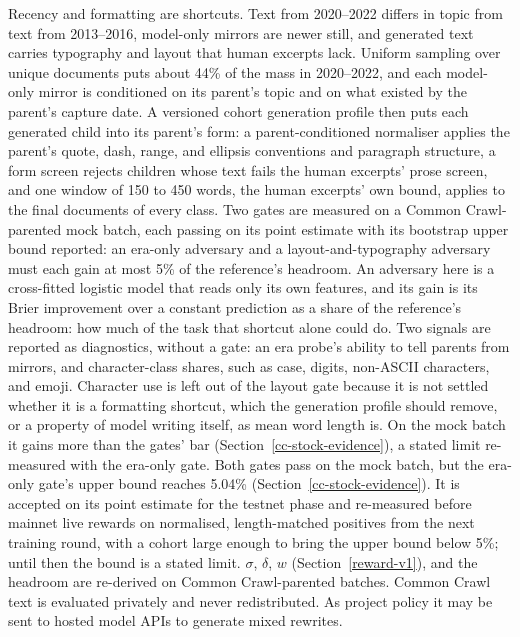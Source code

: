 Recency and formatting are shortcuts. Text from 2020--2022 differs in topic from
text from 2013--2016, model-only mirrors are newer still, and generated text
carries typography and layout that human excerpts lack. Uniform sampling over
unique documents puts about 44\% of the mass in 2020--2022, and each model-only
mirror is conditioned on its parent's topic and on what existed by the parent's
capture date. A versioned cohort generation profile then puts each generated
child into its parent's form: a parent-conditioned normaliser applies the
parent's quote, dash, range, and ellipsis conventions and paragraph structure, a
form screen rejects children whose text fails the human excerpts' prose screen,
and one window of 150 to 450 words, the human excerpts' own bound, applies to
the final documents of every class. Two gates are measured on a Common
Crawl-parented mock batch, each passing on its point estimate with its bootstrap
upper bound reported: an era-only adversary and a layout-and-typography
adversary must each gain at most 5\% of the reference's headroom. An adversary
here is a cross-fitted logistic model that reads only its own features, and its
gain is its Brier improvement over a constant prediction as a share of the
reference's headroom: how much of the task that shortcut alone could do. Two
signals are reported as diagnostics, without a gate: an era probe's ability to
tell parents from mirrors, and character-class shares, such as case, digits,
non-ASCII characters, and emoji. Character use is left out of the layout gate
because it is not settled whether it is a formatting shortcut, which the
generation profile should remove, or a property of model writing itself, as
mean word length is. On the mock batch it gains more than the gates' bar
(Section~\ref{cc-stock-evidence}), a stated limit re-measured with the
era-only gate. Both gates pass on the mock batch, but the era-only
gate's upper bound reaches 5.04\% (Section~\ref{cc-stock-evidence}). It is
accepted on its point estimate for the testnet phase and re-measured before
mainnet live rewards on normalised, length-matched positives from the next
training round, with a cohort large enough to bring the upper bound below 5\%;
until then the bound is a stated limit. \(\sigma\), \(\delta\), \(w\)
(Section~\ref{reward-v1}), and the headroom are re-derived on Common
Crawl-parented batches. Common Crawl text is
evaluated privately and never redistributed. As project policy it may be sent to
hosted model APIs to generate mixed rewrites.

